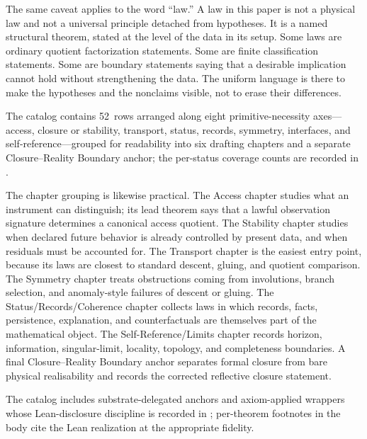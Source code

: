 \documentclass[11pt]{article}
\newcommand{\NumLaws}{52}
\theoremstyle{definition}
\begin{document}
The same caveat applies to the word ``law.''  A law in this
paper is not a physical law and not a universal principle detached
from hypotheses.  It is a named structural theorem, stated at the
level of the data in its setup.  Some laws are ordinary quotient
factorization statements.  Some are finite classification
statements.  Some are boundary statements saying that a desirable
implication cannot hold without strengthening the data.  The uniform
language is there to make the hypotheses and the nonclaims visible,
not to erase their differences.

The catalog contains \NumLaws\ rows arranged along eight
primitive-necessity axes---access, closure or stability, transport,
status, records, symmetry, interfaces, and self-reference---grouped
for readability into six drafting chapters and a separate
Closure--Reality Boundary anchor; the per-status coverage counts are
recorded in .

The chapter grouping is likewise practical.  The Access chapter
studies what an instrument can distinguish; its lead theorem says
that a lawful observation signature determines a canonical access
quotient.  The Stability chapter studies when declared future
behavior is already controlled by present data, and when residuals
must be accounted for.  The Transport chapter is the easiest entry
point, because its laws are closest to standard descent, gluing, and
quotient comparison.  The Symmetry chapter treats obstructions
coming from involutions, branch selection, and anomaly-style failures
of descent or gluing.  The Status/Records/Coherence chapter collects
laws in which records, facts, persistence, explanation, and
counterfactuals are themselves part of the mathematical object.  The
Self-Reference/Limits chapter records horizon, information,
singular-limit, locality, topology, and completeness boundaries.  A
final Closure--Reality Boundary anchor separates formal closure from
bare physical realisability and records the corrected reflective
closure statement.

The catalog includes substrate-delegated anchors and axiom-applied
wrappers whose Lean-disclosure discipline is recorded in
; per-theorem footnotes in the body cite the
Lean realization at the appropriate fidelity.
\end{document}
